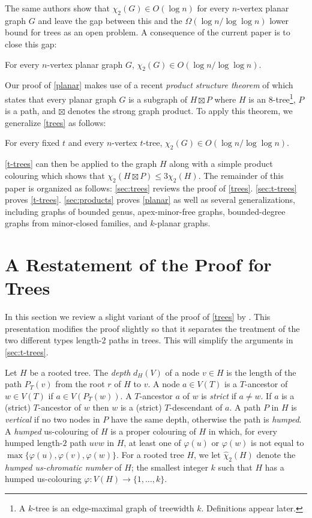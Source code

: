 \documentclass[kpfonts]{patmorin}
\newcommand{\uqs}{\chi_2}
\newcommand{\hus}{\hat{\chi}_2}
\begin{document}
The same authors show that $\uqs(G)\in O(\log n)$ for every $n$-vertex planar graph $G$ and leave the gap between this and the $\Omega(\log n/\log\log n)$ lower bound for trees as an open problem.  A consequence of the current paper is to close this gap:

\begin{thm}\label{planar}
    For every $n$-vertex planar graph $G$, $\uqs(G)\in O(\log n/\log\log n)$.
\end{thm}

Our proof of \cref{planar} makes use of a recent \emph{product structure theorem} of \citet{dujmovic.joret.ea:planar} which states that every planar graph $G$ is a subgraph of $H\boxtimes P$ where $H$ is an $8$-tree\footnote{A $k$-tree is an edge-maximal graph of treewidth $k$. Definitions appear later.}, $P$ is a path, and $\boxtimes$ denotes the strong graph product.  To apply this theorem, we generalize \cref{trees} as follows:

\begin{thm}\label{t-trees}
    For every fixed $t$ and every $n$-vertex $t$-tree, $\uqs(G) \in O(\log n/\log\log n)$.
\end{thm}

\cref{t-trees} can then be applied to the graph $H$ along with a simple product colouring which shows that $\uqs(H\boxtimes P)\le 3\uqs(H)$.  The remainder of this paper is organized as follows: \cref{sec:trees} reviews the proof of \cref{trees}. \cref{sec:t-trees} proves \cref{t-trees}.  \cref{sec:products} proves \cref{planar} as well as several generalizations, including graphs of bounded genus, apex-minor-free graphs, bounded-degree graphs from minor-closed families, and $k$-planar graphs.




\section{A Restatement of the Proof for Trees}

In this section we review a slight variant of the proof of \cref{trees} by \citet{karpas.neiman.ea:on}. This presentation modifies the proof slightly so that it separates the treatment of the two different types length-$2$ paths in trees. This will simplify the arguments in \cref{sec:t-trees}.

Let $H$ be a rooted tree.  The \emph{depth} $d_H(V)$ of a node $v\in H$ is the length of the path $P_T(v)$ from the root $r$ of $H$ to $v$.  A node $a\in V(T)$ is a $T$-ancestor of $w\in V(T)$ if $a\in V(P_T(w))$.  A $T$-ancestor $a$ of $w$ is \emph{strict} if $a\neq w$.  If $a$ is a (strict) $T$-ancestor of $w$ then $w$ is a (strict) $T$-descendant of $a$.  A path $P$ in $H$ is \emph{vertical} if no two nodes in $P$ have the same depth, otherwise the path is \emph{humped}.  A \emph{humped} us-colouring of $H$ is a proper colouring of $H$ in which, for every humped length-$2$ path $uvw$ in $H$, at least one of $\varphi(u)$ or $\varphi(w)$ is not equal to $\max\{\varphi(u),\varphi(v),\varphi(w)\}$.  For a rooted tree $H$, we let $\hus(H)$ denote the \emph{humped us-chromatic number} of $H$; the smallest integer $k$ such that $H$ has a humped us-colouring $\varphi:V(H)\to\{1,\ldots,k\}$.
\end{document}

